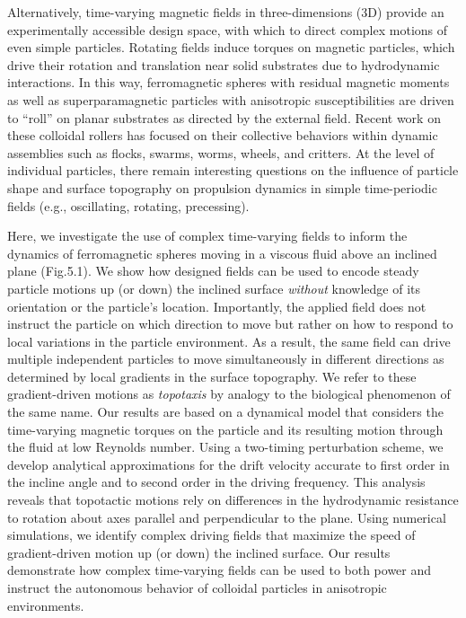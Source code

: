 Alternatively, time-varying magnetic fields in three-dimensions (3D) provide an experimentally accessible design space, with which to direct complex motions of even simple particles. Rotating fields induce torques on magnetic particles,\autocite{janssen2009controlled} which drive their rotation and translation near solid substrates due to hydrodynamic interactions.\autocite{Swan2007} In this way, ferromagnetic spheres with residual magnetic moments\autocite{Driscoll2017} as well as superparamagnetic particles with anisotropic susceptibilities\autocite{tierno2008controlled} are driven to “roll” on planar substrates as directed by the external field. Recent work on these colloidal rollers has focused on their collective behaviors within dynamic assemblies such as flocks,\autocite{kaiser2017flocking} swarms,\autocite{xie2019reconfigurable} worms,\autocite{Martinez-Pedrero2015} wheels,\autocite{tasci2016surface} and critters.\autocite{Driscoll2017} At the level of individual particles, there remain interesting questions on the influence of particle shape\autocite{zhang2010controlled} and surface topography\autocite{yang2019microwheels} on propulsion dynamics in simple time-periodic fields (e.g., oscillating, rotating, precessing).
 
Here, we investigate the use of complex time-varying fields to inform the dynamics of ferromagnetic spheres moving in a viscous fluid above an inclined plane (Fig.5.1). We show how designed fields can be used to encode steady particle motions up (or down) the inclined surface \emph{without} knowledge of its orientation or the particle’s location. Importantly, the applied field does not instruct the particle on which direction to move but rather on how to respond to local variations in the particle environment. As a result, the same field can drive multiple independent particles to move simultaneously in different directions as determined by local gradients in the surface topography.  We refer to these gradient-driven motions as \emph{topotaxis} by analogy to the biological phenomenon of the same name.\autocite{park2018topotaxis} Our results are based on a dynamical model that considers the time-varying magnetic torques on the particle and its resulting motion through the fluid at low Reynolds number. Using a two-timing perturbation scheme, we develop analytical approximations for the drift velocity accurate to first order in the incline angle and to second order in the driving frequency.   This analysis reveals that topotactic motions rely on differences in the hydrodynamic resistance to rotation about axes parallel and perpendicular to the plane. Using numerical simulations, we identify complex driving fields that maximize the speed of gradient-driven motion up (or down) the inclined surface.  Our results demonstrate how complex time-varying fields can be used to both power and instruct the autonomous behavior of colloidal particles in anisotropic environments.





